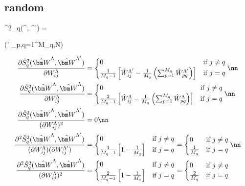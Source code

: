 \subsection{random}

\beq
{}^2_q(^\Lambda, ^{\Lambda'}) = \left[\sum_{p=1}^{M_q}\hat{W}_{pq}^\Lambda\hat{W}_{pq}^{\Lambda'} - \frac{1}{M_q}\left(\sum_{i=1}^{M_q}\hat{W}_{pq}^\Lambda\right)\left(\sum_{p=1}^{M_q}\hat{W}_{pq}^{\Lambda'}\right)\right]
\eeq

\beq
\exp\left(\Lambda' \sum_{p,q=1}^{M_q,N}\right)
\eeq

\begin{align}
\frac{\partial \hat{S}^2_q(\hat{\bm W}^\Lambda, \hat{\bm W}^{\Lambda'})}{\partial W_{ij}^\Lambda} &= \begin{cases}
0 & {\rm if} \; j \neq q \\
\frac{1}{M_q-1}\left[\hat{W}_{ij}^{\Lambda'} - \frac{1}{M_q}\left(\sum_{p=1}^{M_q}\hat{W}_{pq}^{\Lambda'}\right)\right] & {\rm if}\; j = q 
\end{cases} \nn
\\
\frac{\partial \hat{S}^2_q(\hat{\bm W}^\Lambda, \hat{\bm W}^{\Lambda})}{\partial W_{ij}^\Lambda} &= \begin{cases}
0 & {\rm if} \; j \neq q \\
\frac{2}{M_q-1}\left[\hat{W}_{ij}^{\Lambda} - \frac{1}{M_q}\left(\sum_{p=1}^{M_q}\hat{W}_{pq}^{\Lambda}\right)\right] & {\rm if}\; j = q 
\end{cases} \nn
\\
\frac{\partial \hat{S}^2_q(\hat{\bm W}^\Lambda, \hat{\bm W}^{\Lambda'})}{(\partial W_{ij}^\Lambda)^2} &= 0 \nn
\\
\frac{\partial^2 \hat{S}^2_q(\hat{\bm W}^\Lambda, \hat{\bm W}^{\Lambda'})}{(\partial W_{ij}^\Lambda)(\partial W_{ij}^{\Lambda'})} &= \begin{cases}
0 & {\rm if} \; j \neq q \\
\frac{1}{M_q-1}\left[1 - \frac{1}{M_q}\right] & {\rm if}\; j = q 
\end{cases} = \begin{cases}
0 & {\rm if} \; j \neq q \\
\frac{1}{M_q} & {\rm if}\; j = q \end{cases} \nn
\\
\frac{\partial^2 \hat{S}^2_q(\hat{\bm W}^\Lambda, \hat{\bm W}^{\Lambda})}{(\partial W_{ij}^\Lambda)^2} &= \begin{cases}
0 & {\rm if} \; j \neq q \\
\frac{2}{M_q-1}\left[1 - \frac{1}{M_q}\right] & {\rm if}\; j = q 
\end{cases} = \begin{cases}
0 & {\rm if} \; j \neq q \\
\frac{2}{M_q} & {\rm if}\; j = q 
\end{cases}
\label{eq: variance estimator derivatives}
\end{align}



